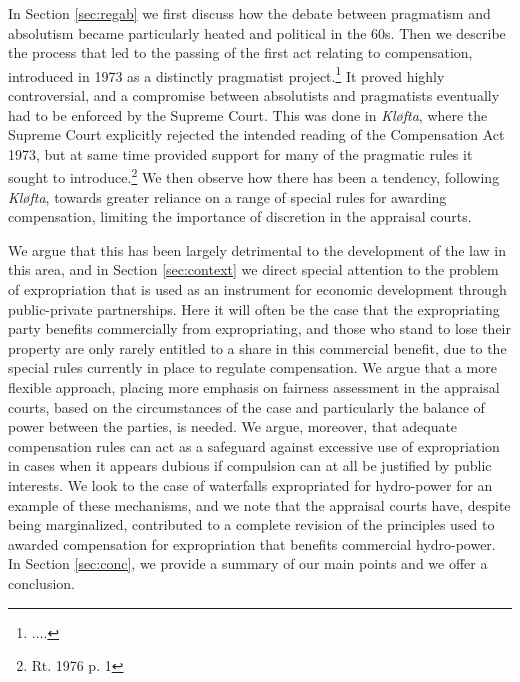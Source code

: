 In Section \ref{sec:regab} we first discuss how the debate between pragmatism and absolutism became particularly heated and political in the 60s. Then we describe the process that led to the passing of the first act relating to compensation, introduced in 1973 as a distinctly pragmatist project.\footnote{....} It proved highly controversial, and a compromise between absolutists and pragmatists eventually had to be enforced by the Supreme Court. This was done in \emph{Kløfta}, where the Supreme Court explicitly rejected the intended reading of the Compensation Act 1973, but at same time provided support for many of the pragmatic rules it sought to introduce.\footnote{Rt. 1976 p. 1} We then observe how there has been a tendency, following \emph{Kløfta}, towards greater reliance on a range of special rules for awarding compensation, limiting the importance of discretion in the appraisal courts. 

We argue that this has been largely detrimental to the development of the law in this area, and in Section \ref{sec:context} we direct special attention to the problem of expropriation that is used as an instrument for economic development through public-private partnerships. Here it will often be the case that the expropriating party benefits commercially from expropriating, and those who stand to lose their property are only rarely entitled to a share in this commercial benefit, due to the special rules currently in place to regulate compensation. We argue that a more flexible approach, placing more emphasis on fairness assessment in the appraisal courts, based on the circumstances of the case and particularly the balance of power between the parties, is needed. We argue, moreover, that adequate compensation rules can act as a safeguard against excessive use of expropriation in cases when it appears dubious if compulsion can at all be justified by public interests. We look to the case of waterfalls expropriated for hydro-power for an example of these mechanisms, and we note that the appraisal courts have, despite being marginalized, contributed to a complete revision of the principles used to awarded compensation for expropriation that benefits commercial hydro-power. In Section \ref{sec:conc}, we provide a summary of our main points and we offer a conclusion.

